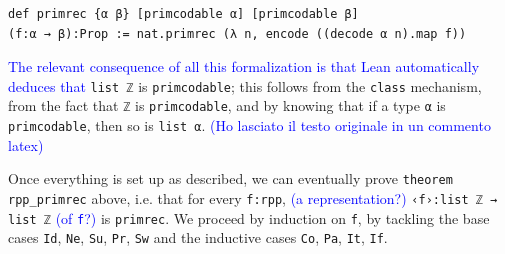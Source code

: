 \documentclass[preprint]{elsarticle}
\theoremstyle{remark}
\newcommand{\MATHLIB}{\textsf{mathlib}\xspace}
\newcommand{\LEAN}{\textsf{Lean}\xspace}
\begin{document}
\begin{lstlisting}
def primrec {α β} [primcodable α] [primcodable β]
(f:α → β):Prop := nat.primrec (λ n, encode ((decode α n).map f))
\end{lstlisting}

\textcolor{blue}{The relevant consequence of all this formalization is that \LEAN automatically deduces that} \lstinline|list ℤ| is \lstinline|primcodable|; this follows from the \lstinline|class| mechanism, from the fact that \lstinline|ℤ| is \lstinline|primcodable|, and by knowing that if a type \lstinline|α| is \lstinline|primcodable|, then so is \lstinline|list α|.
\textcolor{blue}{(Ho lasciato il testo originale in un commento latex)}

\vspace{\baselineskip}
Once everything is set up as described, we can eventually prove \lstinline|theorem rpp_primrec| above, i.e.\@
that for every \lstinline|f:rpp|, \textcolor{blue}{(a representation?)} \lstinline|‹f›:list ℤ → list ℤ| \textcolor{blue}{(of \texttt{f}?)} is \lstinline|primrec|. We proceed by induction on \lstinline|f|, by tackling the base cases \lstinline|Id|, \lstinline|Ne|, \lstinline|Su|, \lstinline|Pr|, \lstinline|Sw| and the inductive cases \lstinline|Co|, \lstinline|Pa|, \lstinline|It|, \lstinline|If|.


\end{document}
